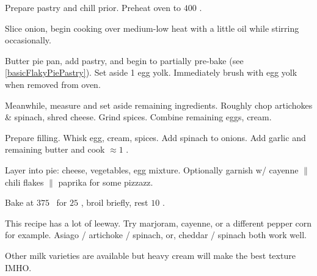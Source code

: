 \begin{preparation}
\item Prepare pastry and chill prior.
	Preheat oven to $400$ \Fahrenheit.

\item Slice onion, begin cooking over medium-low heat with a little oil while stirring occasionally.

\item Butter pie pan, add pastry, and begin to partially pre-bake (see \ref{basicFlakyPiePastry}).
	Set aside 1 egg yolk.
	Immediately brush with egg yolk when removed from oven.

\item Meanwhile, measure and set aside remaining ingredients.
	Roughly chop artichokes \& spinach, shred cheese.
	Grind spices.
	Combine remaining eggs, cream.

\item Prepare filling.
	Whisk egg, cream, spices.
	Add spinach to onions.
	Add garlic and remaining butter and cook $\approx 1$ \minute.

\item Layer into pie: cheese, vegetables, egg mixture.
	Optionally garnish w/ cayenne $\|$ chili flakes $\|$ paprika for some pizzazz.

\item Bake at $375$ \Fahrenheit~for $25$ \minute, broil briefly, rest $10$ \minute.
\end{preparation}


\begin{variation}
\item This recipe has a lot of leeway. Try marjoram, cayenne, or a different pepper corn for example. Asiago / artichoke / spinach, or, cheddar / spinach both work well.
\item Other milk varieties are available but heavy cream will make the best texture IMHO.
\end{variation}


\recipeend
